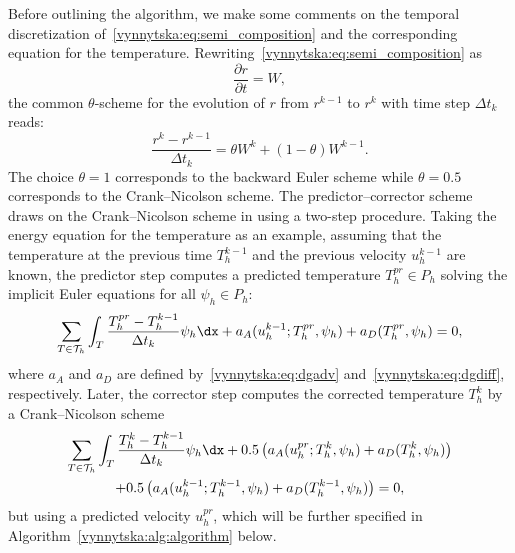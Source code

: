 Before outlining the algorithm, we make some comments on the temporal
discretization of~\eqref{vynnytska:eq:semi_composition}
and the corresponding equation for the
temperature. Rewriting~\eqref{vynnytska:eq:semi_composition} as
\begin{equation}
  \frac{\partial r}{\partial t} = W,
\end{equation}
the common $\theta$-scheme for the evolution of $r$ from $r^{k-1}$ to
$r^k$ with time step $\Delta t_k$ reads:
\begin{equation}
  \label{vynnytska:eq:thetascheme}
  \frac{r^k - r^{k-1}}{\Delta t_k} = \theta W^k + (1 - \theta) W^{k-1}.
\end{equation}
The choice $\theta = 1$ corresponds to the backward Euler scheme
while $\theta = 0.5$ corresponds to the Crank--Nicolson scheme. The
predictor--corrector scheme draws on the Crank--Nicolson scheme in using a
two-step procedure. Taking the energy equation for the temperature as an
example, assuming that the temperature at the previous time $T_h^{k-1}$
and the previous velocity $u_h^{k-1}$ are known, the predictor step
computes a predicted temperature $T_h^{pr} \in P_h$ solving the implicit
Euler equations for all $\psi_h \in P_h$:
\begin{equation}
  \label{vynnytska:eq:predictor}
  \sum_{T \in \mathcal{T}_h}
  \int_T \frac{T_h^{pr} - T_h^{k-1}}{\Delta t_k} \psi_h \dx
  + a_{A} (u_h^{k-1}; T_h^{pr}, \psi_h) + a_D (T_h^{pr}, \psi_h) = 0,
\end{equation}
where $a_A$ and $a_D$ are defined by~\eqref{vynnytska:eq:dgadv}
and~\eqref{vynnytska:eq:dgdiff}, respectively. Later, the corrector
step computes the corrected temperature $T_h^k$ by a Crank--Nicolson
scheme
\begin{multline}
  \label{vynnytska:eq:corrector}
    \sum_{T \in \mathcal{T}_h}
    \int_T \frac{T_h^k - T_h^{k-1}}{\Delta t_k} \psi_h \dx
    + 0.5 \left( a_{A} (u_h^{pr}; T_h^{k}, \psi_h)
    + a_D (T_h^{k}, \psi_h) \right)
\\
    + 0.5 \left( a_{A} (u_h^{k-1}; T_h^{k-1}, \psi_h)
    + a_D (T_h^{k-1}, \psi_h) \right) = 0,
\end{multline}
but using a predicted velocity $u_h^{pr}$, which will be further
specified in Algorithm~\ref{vynnytska:alg:algorithm}
below.
